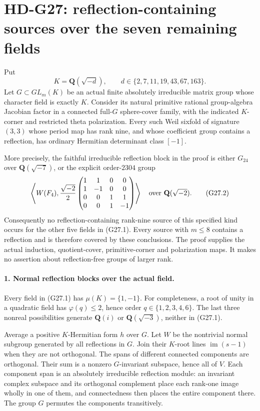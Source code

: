 \section{HD-G27: reflection-containing sources over the seven remaining fields}
\label{sec:other-fields-reflection-scope}

Put
\[
 K=\mathbf Q(\sqrt{-d}),\qquad
                 d\in\{2,7,11,19,43,67,163\}.                 \tag{G27.1}
\]
Let \(G\subset GL_m(K)\) be an actual finite absolutely irreducible
matrix group whose character field is exactly \(K\). Consider its
natural primitive rational group-algebra Jacobian factor in a
connected full-\(G\) sphere-cover family, with the indicated
\(K\)-corner and restricted theta polarization. Every such Weil
sixfold of signature \((3,3)\) whose period map has rank nine,
and whose coefficient group contains a reflection, has ordinary
Hermitian determinant class \([-1]\).

More precisely, the faithful irreducible reflection block in the
proof is either \(G_{24}\) over \(\mathbf Q(\sqrt{-7})\), or the
explicit order-\(2304\) group
\[
 \left\langle W(F_4),\frac{\sqrt{-2}}2
 \begin{pmatrix}1&1&0&0\\1&-1&0&0\\0&0&1&1\\0&0&1&-1\end{pmatrix}
 \right\rangle
             \quad\hbox{over }\mathbf Q(\sqrt{-2}).           \tag{G27.2}
\]
Consequently no reflection-containing rank-nine source of this
specified kind occurs for the other five fields in (G27.1).
Every source with \(m\le8\) contains a reflection and is therefore
covered by these conclusions. The proof supplies the actual
induction, quotient-cover, primitive-corner and polarization maps.
It makes no assertion about reflection-free groups of larger rank.

\paragraph{1. Normal reflection blocks over the actual field.}
Every field in (G27.1) has \(\mu(K)=\{1,-1\}\).
For completeness, a root of unity in a quadratic field has
\(\varphi(q)\le2\), hence order \(q\in\{1,2,3,4,6\}\).
The last three nonreal possibilities generate
\(\mathbf Q(i)\) or \(\mathbf Q(\sqrt{-3})\), neither in (G27.1).

Average a positive \(K\)-Hermitian form \(h\) over \(G\).
Let \(W\) be the nontrivial normal subgroup generated by all
reflections in \(G\). Join their \(K\)-root lines
\(\operatorname{im}(s-1)\) when they are not orthogonal.
The spans of different connected components are orthogonal.
Their sum is a nonzero \(G\)-invariant subspace, hence all of \(V\).
Each component span is an absolutely irreducible reflection
module: an invariant complex subspace and its orthogonal
complement place each rank-one image wholly in one of them,
and connectedness then places the entire component there.
The group \(G\) permutes the components transitively.

